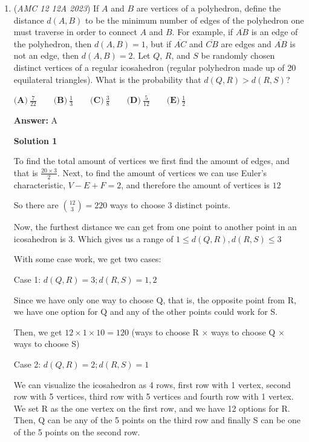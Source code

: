 \begin{enumerate}
 Answer: $\boxed{(C) 5}$



	\item (\textit{AMC 12 12A 2023}) If $A$ and $B$ are vertices of a polyhedron, define the distance $d(A, B)$ to be the minimum number of edges of the polyhedron one must traverse in order to connect $A$ and $B$. For example, if $\overline{AB}$ is an edge of the polyhedron, then $d(A, B) = 1$, but if $\overline{AC}$ and $\overline{CB}$ are edges and $\overline{AB}$ is not an edge, then $d(A, B) = 2$. Let $Q$, $R$, and $S$ be randomly chosen distinct vertices of a regular icosahedron (regular polyhedron made up of 20 equilateral triangles). What is the probability that $d(Q, R) > d(R, S)$?


 $\textbf{(A)}~\frac{7}{22}\qquad\textbf{(B)}~\frac13\qquad\textbf{(C)}~\frac38\qquad\textbf{(D)}~\frac5{12}\qquad\textbf{(E)}~\frac12$

 \textbf{Answer: }A



\textbf{Solution 1}

To find the total amount of vertices we first find the amount of edges, and that is $\frac{20 \times 3}{2}$. Next, to find the amount of vertices we can use Euler's characteristic, $V - E + F = 2$, and therefore the amount of vertices is $12$ 

 So there are $\binom{12}{3} = 220$ ways to choose 3 distinct points.

 Now, the furthest distance we can get from one point to another point in an icosahedron is 3. Which gives us a range of $1 \leq d(Q, R), d(R, S) \leq 3$

 With some case work, we get two cases:

 Case 1: $d(Q, R) = 3; d(R, S) = 1, 2$

 Since we have only one way to choose Q, that is, the opposite point from R, we have one option for Q and any of the other points could work for S.

 Then, we get $12 \times 1 \times 10 = 120$ (ways to choose R × ways to choose Q × ways to choose S)

 Case 2: $d(Q, R) = 2; d(R, S) = 1$

 We can visualize the icosahedron as 4 rows, first row with 1 vertex, second row with 5 vertices, third row with 5 vertices and fourth row with 1 vertex. We set R as the one vertex on the first row, and we have 12 options for R. Then, Q can be any of the 5 points on the third row and finally S can be one of the 5 points on the second row.


\end{enumerate}

